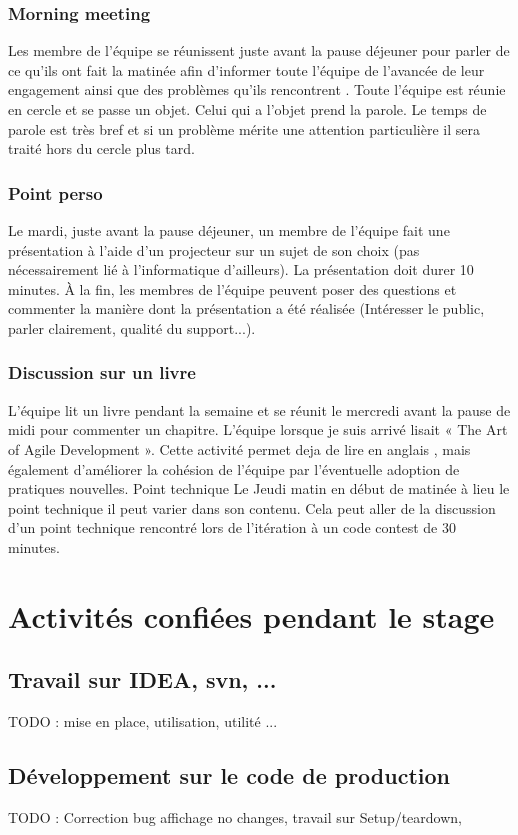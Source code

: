 \subsubsection{Morning meeting}
Les membre de l'équipe se réunissent juste avant la pause déjeuner pour parler de ce qu'ils ont fait la matinée afin d'informer toute l'équipe de l'avancée de leur engagement ainsi que des problèmes qu'ils rencontrent . Toute l'équipe est réunie en cercle et se passe un objet. Celui qui a l'objet prend la parole. Le temps de parole est très bref et si un problème mérite une attention particulière il sera traité hors du cercle plus tard.

\subsubsection{Point perso}
Le mardi, juste avant la pause déjeuner, un membre de l'équipe fait une présentation à l'aide d'un projecteur sur un sujet de son choix (pas nécessairement lié à l'informatique d'ailleurs). La présentation doit durer 10 minutes. \`A la fin, les membres de l'équipe peuvent poser des questions et commenter la manière dont la présentation a été réalisée (Intéresser le public, parler clairement, qualité du support...).

\subsubsection{Discussion sur un livre}
L'équipe lit un livre pendant la semaine et se réunit le mercredi avant la pause de midi pour commenter un chapitre. L'équipe lorsque je suis arrivé lisait « The Art of Agile Development ». Cette activité permet deja de lire en anglais , mais également d'améliorer la cohésion de l'équipe par l'éventuelle adoption de pratiques nouvelles.
Point technique
Le Jeudi matin en début de matinée à lieu le point technique il peut varier dans son contenu. Cela peut aller de la discussion d'un point technique rencontré lors de l'itération à un code contest de 30 minutes.

\section{Activités confiées pendant le stage}
\subsection{Travail sur IDEA, svn, ...}
TODO : mise en place, utilisation, utilité ...
\subsection{Développement sur le code de production}
TODO : Correction bug affichage no changes, travail sur Setup/teardown, 
